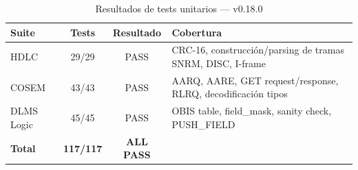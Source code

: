 \begin{table}[htbp]
\centering
\caption{Resultados de tests unitarios --- v0.18.0}
\label{tab:unit_tests_v018}
\begin{tabular}{@{}lccl@{}}
\toprule
\textbf{Suite} & \textbf{Tests} & \textbf{Resultado} & \textbf{Cobertura} \\
\midrule
HDLC        & 29/29 & PASS & CRC-16, construcción/parsing de tramas SNRM, DISC, I-frame \\
COSEM       & 43/43 & PASS & AARQ, AARE, GET request/response, RLRQ, decodificación tipos \\
DLMS Logic  & 45/45 & PASS & OBIS table, field\_mask, sanity check, PUSH\_FIELD \\
\midrule
\textbf{Total} & \textbf{117/117} & \textbf{ALL PASS} & \\
\bottomrule
\end{tabular}
\end{table}

